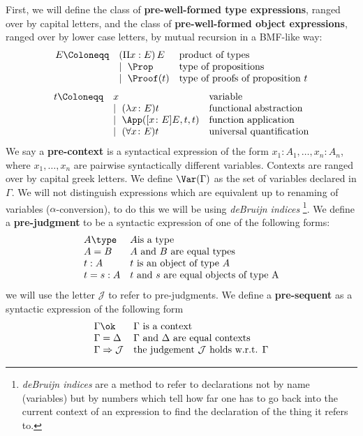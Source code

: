 First, we will define the class of \textbf{pre-well-formed type expressions},
ranged over by capital letters, 
and the class of \textbf{pre-well-formed object expressions},
ranged over by lower case letters, by mutual recursion in a BMF-like way: %
\[
\begin{array}{lll}
  E \Coloneqq & (\Pi x : E)\, E & \text{product of types} \\
        & \mid\ \Prop & \text{type of propositions} \\
        & \mid\ \Proof(t) & \text{type of proofs of proposition } t
\end{array}
\]
\[
\begin{array}{lll}
    t \Coloneqq & x & \text{variable} \\
        & \mid\ (\lambda x \colon E) t & \text{functional abstraction} \\
        & \mid\ \App([x \colon E ] E, t, t) & \text{function application} \\
        & \mid\ (\forall x \colon E) t & \text{universal quantification} 

\end{array}
\]
We say a \textbf{pre-context} is a syntactical expression of the form 
$x_1 : A_1, \dots, x_n : A_n$, where $x_1, \dots, x_n$ are pairwise 
syntactically different variables. 
Contexts are ranged over by capital greek letters.
We define $\Var(\Gamma)$ as the set of variables declared in $\Gamma$.
We will not distinguish expressions which are equivalent up to renaming of variables
($\alpha$-conversion), to do this we will be using \textit{deBruijn indices}
\footnote{
    \textit{deBruijn indices} are a method to refer to declarations not by name (variables)
    but by numbers which tell how far one has to go back into the current context of an expression
    to find the declaration of the thing it refers to.   
}.
We define a \textbf{pre-judgment} to be a syntactic expression of one of the following forms:
\[
\begin{array}{ll}
    A \type & A \text{is a type} \\
    A = B & A \text{ and } B \text{ are equal types} \\
    t : A & t \text{ is an object of type } A \\
    t = s : A & t \text{ and } s \text{ are equal objects of type } $A$
\end{array}
\]
we will use the letter $\mathcal{J}$ to refer to pre-judgments.
We define a \textbf{pre-sequent} as a syntactic expression of the following form
\[
\begin{array}{ll}
    \Gamma \ok & \Gamma \text{ is a context} \\
    \Gamma = \Delta & \Gamma \text{ and } \Delta \text{ are equal contexts} \\
    \Gamma \Rightarrow \mathcal{J} & \text{the judgement } \mathcal{J} \text{ holds w.r.t. } \Gamma
\end{array}
\]


